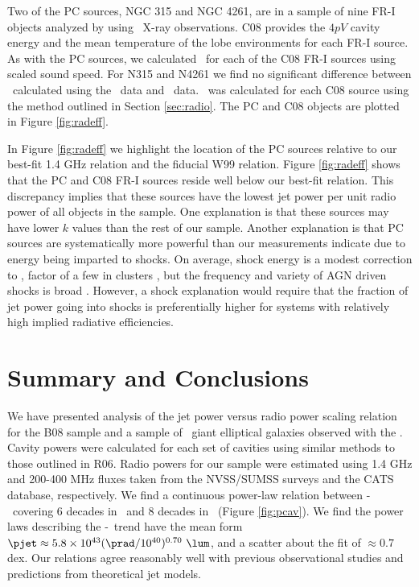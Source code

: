 \documentclass{emulateapj}
\begin{document}
Two of the PC sources, NGC 315 and NGC 4261, are in a sample of nine
FR-I objects analyzed by \citet[][hereafter C08]{2008MNRAS.386.1709C}
using \xmm\ X-ray observations. C08 provides the $4pV$ cavity energy
and the mean temperature of the lobe environments for each FR-I
source. As with the PC sources, we calculated \pcav\ for each of the
C08 FR-I sources using scaled sound speed. For N315 and N4261 we find
no significant difference between \pcav\ calculated using the
\chandra\ data and \xmm\ data. \phigh\ was calculated for each C08
source using the method outlined in Section \ref{sec:radio}. The PC
and C08 objects are plotted in Figure \ref{fig:radeff}.

In Figure \ref{fig:radeff} we highlight the location of the PC sources
relative to our best-fit 1.4 GHz relation and the fiducial W99
relation. Figure \ref{fig:radeff} shows that the PC and C08 FR-I
sources reside well below our best-fit relation. This discrepancy
implies that these sources have the lowest jet power per unit radio
power of all objects in the sample. One explanation is that these
sources may have lower $k$ values than the rest of our sample. Another
explanation is that PC sources are systematically more powerful than
our measurements indicate due to energy being imparted to shocks. On
average, shock energy is a modest correction to \pcav, factor of a few
in clusters \citep{mcnamrev}, but the frequency and variety of AGN
driven shocks is broad \citep[\eg][]{2003ApJ...592..129K, hydraa,
  herca, 2003ApJ...592..129K}. However, a shock explanation would
require that the fraction of jet power going into shocks is
preferentially higher for systems with relatively high implied
radiative efficiencies.

\section{Summary and Conclusions}
\label{sec:summary}

We have presented analysis of the jet power versus radio power scaling
relation for the B08 sample and a sample of \samp\ giant elliptical
galaxies observed with the \cxo. Cavity powers were calculated for
each set of cavities using similar methods to those outlined in
R06. Radio powers for our sample were estimated using 1.4 GHz and
200-400 MHz fluxes taken from the NVSS/SUMSS surveys and the CATS
database, respectively. We find a continuous power-law relation
between \pjet-\prad\ covering 6 decades in \prad\ and 8 decades in
\pjet\ (Figure \ref{fig:pcav}). We find the power laws describing the
\pjet-\prad\ trend have the mean form $\pjet \approx 5.8 \times
10^{43} (\prad/10^{40})^{0.70} ~\lum$, and a scatter about the fit of
$\approx 0.7$ dex. Our relations agree reasonably well with previous
observational studies and predictions from theoretical jet models.
\end{document}
